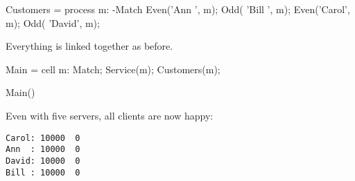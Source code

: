 \begin{code}
Customers = process m: -Match
{
   Even('Ann  ', m);
   Odd( 'Bill ', m);
   Even('Carol', m);
   Odd( 'David', m);
}
\end{code}

Everything is linked together as before.
\begin{code}
Main = cell
{
  m: Match;
  Service(m);
  Customers(m);
}

Main()
\end{code}

Even with five servers, all clients are now happy:
\begin{verbatim}
Carol: 10000  0
Ann  : 10000  0
David: 10000  0
Bill : 10000  0
\end{verbatim}


